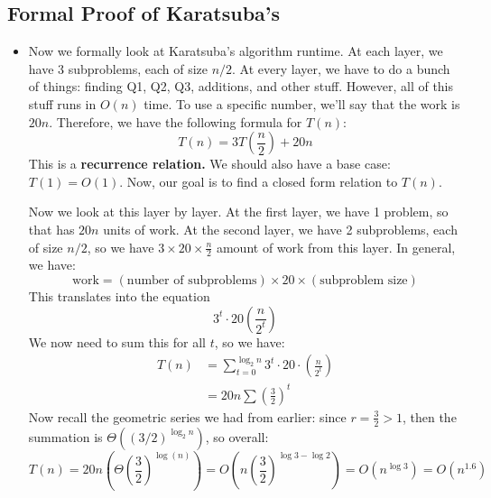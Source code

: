 \subsection{Formal Proof of Karatsuba's}
\begin{itemize}
	\item Now we formally look at Karatsuba's algorithm runtime. At each layer, we have 3 subproblems, each of size \( n / 2 \).  
		At every layer, we have to do a bunch of things: finding Q1, Q2, Q3, additions, and other stuff. However, all of 
		this stuff runs in \( O(n) \) time. To use a specific number, we'll say that the work is \( 20n \). Therefore, 
		we have the following formula for \( T(n) \): 
		\[
		T(n) = 3T\left( \frac{n}{2} \right)  + 20n
		\] 
		This is a \textbf{recurrence relation.} We should also have a base case: \( T(1) = O(1) \). Now, our goal is to find a 
		closed form relation to \( T(n) \). 

		Now we look at this layer by layer. At the first layer, we have 1 problem, so that has \( 20n \) units of work. At 
		the second layer, we have 2 subproblems, each of size \( n / 2 \), so we have \( 3 \times 20 \times \frac{n}{2} \) 
		amount of work from this layer. In general, we have:
		\[
		\text{work} = (\text{number of subproblems}) \times 20 \times (\text{subproblem size})
		\] 
		This translates into the equation
		\[
		3^{t} \cdot 20 \left( \frac{n}{2^{t}} \right) 
		\] 
		We now need to sum this for all \( t \), so we have:
		\begin{align*}
			T(n) &= \sum_{t = 0}^{\log_2 n}3^{t} \cdot 20 \cdot \left( \frac{n}{2^{t}} \right) \\
			&= 20n \sum \left( \frac{3}{2} \right)^{t} 
		\end{align*}
		Now recall the geometric series we had from earlier: since \( r = \frac{3}{2}> 1 \), then the summation 
		is \( \Theta((3 / 2)^{\log_2 n}) \), so overall:
		\[
		T(n) = 20n \left( \Theta\left( \frac{3}{2} \right)^{\log(n)} \right) = 
		O\left(n \left( \frac{3}{2} \right) ^{\log 3 - \log 2}\right) = O(n^{\log 3}) = O(n^{1.6})
		\] 
\end{itemize}
